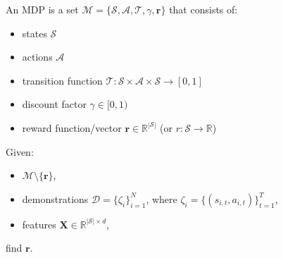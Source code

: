 \documentclass{beamer}
\begin{document}
\begin{frame}
  \begin{definition}
    An MDP is a set $\mathcal{M} = \{\mathcal{S}, \mathcal{A}, \mathcal{T},
    \gamma, \mathbf{r} \}$ that consists of:
    \begin{itemize}
    \item states $\mathcal{S}$
    \item actions $\mathcal{A}$
    \item transition function $\mathcal{T} : \mathcal{S} \times \mathcal{A}
      \times \mathcal{S} \to [0, 1]$
    \item discount factor $\gamma \in [0, 1)$
    \item reward function/vector $\mathbf{r} \in \mathbb{R}^{|\mathcal{S}|}$ (or
      $r : \mathcal{S} \to \mathbb{R}$)
    \end{itemize}
  \end{definition}
  \pause
  \begin{definition}
    Given:
    \begin{itemize}
    \item $\mathcal{M} \setminus \{ \mathbf{r} \}$,
    \item demonstrations $\mathcal{D} = \{ \zeta_i \}_{i=1}^N$, where $\zeta_i =
      \{ (s_{i,t}, a_{i,t}) \}_{t=1}^T$,
    \item features $\mathbf{X} \in \mathbb{R}^{|\mathcal{S}| \times d}$,
    \end{itemize}
    find $\mathbf{r}$.
  \end{definition}
\end{frame}
\end{document}
